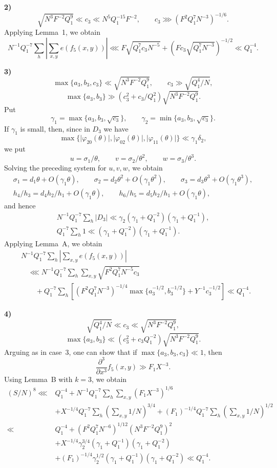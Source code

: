 \documentclass[10pt]{article}
\begin{document}
\medskip
\noindent\textbf{2)}
\[
  \sqrt{N^3F^{-2}Q_1^9}\ll c_3\ll N^5Q_1^{-15}F^{-2},
  \qquad
  c_3\ggg(F^2Q_1^7N^{-3})^{-1/6}.
\]
Applying Lemma~1, we obtain
\[
  N^{-1}Q_1^{-7}\sum_h
  \left\lvert\sum_{x,y}e(f_5(x,y))\right\rvert
  \lll F\sqrt{Q_1^7c_3N^{-5}}
  +(Fc_3\sqrt{Q_1^7N^{-3}})^{-1/2}
  \ll Q_1^{-4}.
\]

\medskip
\noindent\textbf{3)}
\[
  \max\{a_3,b_3,c_3\}\ll\sqrt{N^3F^{-2}Q_1^9},
  \qquad c_3\gg\sqrt{Q_1^4/N},
\]
\[
  \max\{a_3,b_3\}\gg
  (c_3^2+c_3/Q_1^2)\sqrt{N^3F^{-2}Q_1^9}.
\]
Put
\[
  \gamma_1=\max\{a_3,b_3,\sqrt{c_3}\},
  \qquad
  \gamma_2=\min\{a_3,b_3,\sqrt{c_3}\}.
\]
If $\gamma_1$ is small, then, since in $D_3$ we have
\[
  \max\{\lvert\varphi_{20}(\theta)\rvert,
          \lvert\varphi_{02}(\theta)\rvert,
          \lvert\varphi_{11}(\theta)\rvert\}
  \ll\gamma_1\delta_2,
\]
we put
\[
  u=\sigma_1/\theta,\qquad v=\sigma_2/\theta^2,
  \qquad w=\sigma_3/\theta^3.
\]
Solving the preceding system for $u,v,w$, we obtain
\[
\begin{gathered}
 \sigma_1=d_1\theta+O(\gamma_1\theta),\qquad
 \sigma_2=d_2\theta^2+O(\gamma_1\theta^2),\qquad
 \sigma_3=d_3\theta^3+O(\gamma_1\theta^3),\\
 h_4/h_3=d_4h_2/h_1+O(\gamma_1\theta),\qquad
 h_6/h_5=d_5h_2/h_1+O(\gamma_1\theta),
\end{gathered}
\]
and hence
\[
\begin{gathered}
 N^{-1}Q_1^{-7}\sum_h\lvert D_3\rvert
 \ll\gamma_2(\gamma_1+Q_1^{-2})(\gamma_1+Q_1^{-1}),\\
 Q_1^{-7}\sum_h1
 \ll(\gamma_1+Q_1^{-2})(\gamma_1+Q_1^{-1}).
\end{gathered}
\]
Applying Lemma~A, we obtain
\[
\begin{aligned}
&N^{-1}Q_1^{-7}\sum_h
 \left\lvert\sum_{x,y}e(f_5(x,y))\right\rvert\\
&\quad\lll N^{-1}Q_1^{-7}\sum_h\sum_{x,y}
 \sqrt{F^2Q_1^7N^{-5}c_3}\\
&\qquad+Q_1^{-7}\sum_h\left[
 (F^2Q_1^7N^{-3})^{-1/4}
 \max\{a_3^{-1/2},b_3^{-1/2}\}
 +Y^{-1}c_3^{-1/2}
 \right]
 \ll Q_1^{-4}.
\end{aligned}
\]

\medskip
\noindent\textbf{4)}
\[
  \sqrt{Q_1^4/N}\ll c_3\ll\sqrt{N^3F^{-2}Q_1^9},
\]
\[
  \max\{a_3,b_3\}\ll
  (c_3^2+c_3Q_1^{-2})\sqrt{N^3F^{-2}Q_1^9}.
\]
Arguing as in case~3, one can show that if
$\max\{a_3,b_3,c_3\}\ll1$, then
\[
  \frac{\partial^3}{\partial x^3}f_5(x,y)\gg F_1X^{-3}.
\]
Using Lemma~B with $k=3$, we obtain
\[
\begin{aligned}
(S/N)^8\lll{}&Q_1^{-4}
 +N^{-1}Q_1^{-7}\sum_h\sum_{x,y}(F_1X^{-3})^{1/6}\\
&+X^{-1/4}Q_1^{-7}\sum_h
 \left(\sum_{x,y}1/N\right)^{3/4}
 +(F_1)^{-1/4}Q_1^{-7}\sum_h
 \left(\sum_{x,y}1/N\right)^{1/2}\\
\ll{}&Q_1^{-4}
 +(F^2Q_1^7N^{-6})^{1/12}(N^3F^{-2}Q_1^9)^2\\
&+X^{-1/4}\gamma_2^{3/4}
 (\gamma_1+Q_1^{-1})(\gamma_1+Q_1^{-2})\\
&+(F_1)^{-1/4}\gamma_2^{1/2}
 (\gamma_1+Q_1^{-1})(\gamma_1+Q_1^{-2})
 \ll Q_1^{-4}.
\end{aligned}
\]
\end{document}
